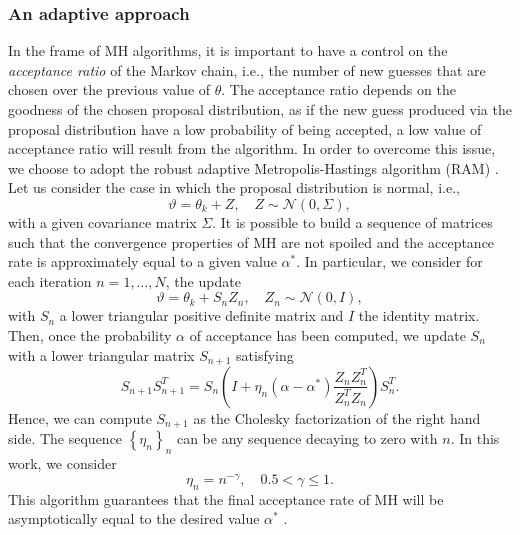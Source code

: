 \subsubsection{An adaptive approach}

In the frame of MH algorithms, it is important to have a control on the \textit{acceptance ratio} of the Markov chain, i.e., the number of new guesses that are chosen over the previous value of $\theta$. The acceptance ratio depends on the goodness of the chosen proposal distribution, as if the new guess produced via the proposal distribution have a low probability of being accepted, a low value of acceptance ratio will result from the algorithm. In order to overcome this issue, we choose to adopt the robust adaptive Metropolis-Hastings algorithm (RAM) \cite{Vih12}. Let us consider the case in which the proposal distribution is normal, i.e.,
\begin{equation}
	\vartheta = \theta_k + Z, \quad Z \sim \mathcal{N}(0, \Sigma),
\end{equation}
with a given covariance matrix $\Sigma$. It is possible to build a sequence of matrices such that the convergence properties of MH are not spoiled and the acceptance rate is approximately equal to a given value $\alpha^*$. In particular, we consider for each iteration $n = 1, \ldots, N$, the update 
\begin{equation}
	\vartheta = \theta_k + S_n Z_n, \quad Z_n \sim \mathcal{N}(0, I),
\end{equation}
with $S_n$ a lower triangular positive definite matrix and $I$ the identity matrix. Then, once the probability $\alpha$ of acceptance has been computed, we update $S_n$ with a lower triangular matrix $S_{n+1}$ satisfying
\begin{equation}
	S_{n+1}S_{n+1}^T = S_n\left(I + \eta_n\left(\alpha - \alpha^*\right)\frac{Z_nZ_n^T}{Z_n^TZ_n}\right)S_n^T.
\end{equation}
Hence, we can compute $S_{n+1}$ as the Cholesky factorization of the right hand side. The sequence $\left\{\eta_n\right\}_n$ can be any sequence decaying to zero with $n$. In this work, we consider
\begin{equation}
	\eta_n = n^{-\gamma}, \quad 0.5 < \gamma \leq 1.
\end{equation}
This algorithm guarantees that the final acceptance rate of MH will be asymptotically equal to the desired value $\alpha^*$ \cite{Vih12}.